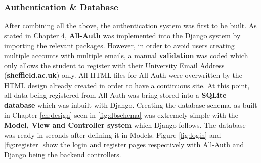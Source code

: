 \documentclass[../main.tex]{subfiles}
\begin{document}
\subsubsection{Authentication \& Database}
After combining all the above, the authentication system was first to be built. As stated in Chapter 4, \textbf{All-Auth}\cite{allauth} was implemented into the Django system by importing the relevant packages. However, in order to avoid users creating multiple accounts with multiple emails, a manual \textbf{validation} was coded which only allows the student to register with their University Email Address (\textbf{sheffield.ac.uk}) only. All HTML files for All-Auth were overwritten by the HTML design already created in order to have a continuous site. At this point, all data being registered from All-Auth was bring stored into a \textbf{SQLite database} which was inbuilt with Django. Creating the database schema, as built in Chapter \ref{ch:design} seen in \ref{fig:dbschema} was extremely simple with the \textbf{Model, View and Controller system} which Django follows. The database was ready in seconds after defining it in Models. Figure \ref{fig:login} and \ref{fig:register} show the login and register pages respectively with All-Auth and Django being the backend controllers. 
\end{document}
